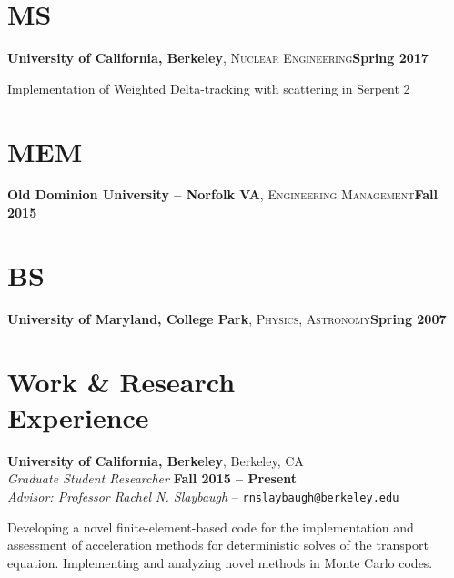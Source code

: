 \documentclass[margin,line]{resume}
\begin{document}
\begin{resume}
    \section{\mysidestyle MS}
    \textbf{University of California, Berkeley}, \textsc{Nuclear
      Engineering}\hfill\textbf{Spring 2017}\vspace{-3mm}\\\vspace{-1mm}%
    \begin{list2}
        \item[] Implementation of Weighted Delta-tracking with
          scattering in Serpent 2
        \end{list2}\vspace{-1.5mm}
    \section{\mysidestyle MEM}
    \textbf{Old Dominion University -- Norfolk VA},
    \textsc{Engineering Management}\hfill\textbf{Fall 2015}\vspace{-3mm}\\\vspace{-1mm}%
    \section{\mysidestyle BS}
    \textbf{University of Maryland, College Park},
    \textsc{Physics, Astronomy}\hfill\textbf{Spring 2007}\vspace{-3mm}\\\vspace{-1mm}%
\vspace{-1.5mm}
    \section{\mysidestyle Work \& Research \\Experience}
    \textbf{University of California, Berkeley}, Berkeley, CA\\
                \textsl{Graduate Student Researcher} \hfill
                \textbf{Fall 2015 -- Present}\\
                \textsl{Advisor: Professor Rachel N. Slaybaugh} -- \verb`rnslaybaugh@berkeley.edu`
                \begin{list2}
                \item[]                 Developing a novel finite-element-based code for the implementation and
                assessment of acceleration methods for deterministic
                solves of the transport
                equation. Implementing and analyzing novel methods in
                Monte Carlo codes.


\end{list2}
\end{resume}
\end{document}
